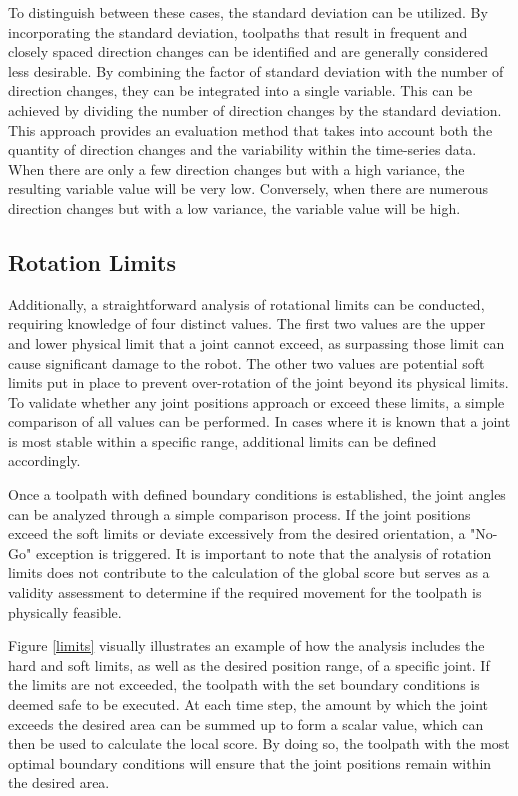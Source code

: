 To distinguish between these cases, the standard deviation can be utilized. By incorporating the standard deviation, toolpaths that result in frequent and closely spaced direction changes can be identified and are generally considered less desirable. By combining the factor of standard deviation with the number of direction changes, they can be integrated into a single variable. This can be achieved by dividing the number of direction changes by the standard deviation. %
This approach provides an evaluation method that takes into account both the quantity of direction changes and the variability within the time-series data. When there are only a few direction changes but with a high variance, the resulting variable value will be very low. Conversely, when there are numerous direction changes but with a low variance, the variable value will be high.




\subsection{Rotation Limits}\label{RotLim}
Additionally, a straightforward analysis of rotational limits can be conducted, requiring knowledge of four distinct values. The first two values are the upper and lower physical limit that a joint cannot exceed, as surpassing those limit can cause significant damage to the robot. The other two values are potential soft limits put in place to prevent over-rotation of the joint beyond its physical limits. To validate whether any joint positions approach or exceed these limits, a simple comparison of all values can be performed. In cases where it is known that a joint is most stable within a specific range, additional limits can be defined accordingly.

Once a toolpath with defined boundary conditions is established, the joint angles can be analyzed through a simple comparison process. If the joint positions exceed the soft limits or deviate excessively from the desired orientation, a "No-Go" exception is triggered. It is important to note that the analysis of rotation limits does not contribute to the calculation of the global score but serves as a validity assessment to determine if the required movement for the toolpath is physically feasible.

Figure \ref{limits} visually illustrates an example of how the analysis includes the hard and soft limits, as well as the desired position range, of a specific joint. If the limits are not exceeded, the toolpath with the set boundary conditions is deemed safe to be executed. At each time step, the amount by which the joint exceeds the desired area can be summed up to form a scalar value, which can then be used to calculate the local score. By doing so, the toolpath with the most optimal boundary conditions will ensure that the joint positions remain within the desired area.

